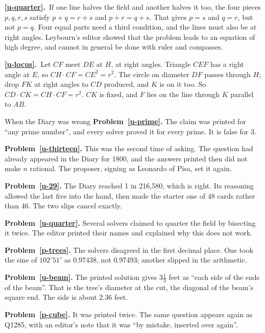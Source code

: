 \documentclass[11pt,a4paper]{article}
\newcounter{prob}
\newcommand{\ans}[2]{\par\smallskip\noindent\textbf{\ref{#1}.}\ #2}
\begin{document}
\ans{u-quarter}{If one line halves the field and another halves it too, the four pieces
$p, q, r, s$ satisfy $p+q = r+s$ and $p+r = q+s$. That gives $p = s$ and $q = r$, but not
$p = q$. Four equal parts need a third condition, and the lines must also be at right
angles. Leybourn's editor showed that the problem leads to an equation of high degree,
and cannot in general be done with ruler and compasses.}
\ans{u-locus}{Let $CF$ meet $DE$ at $H$, at right angles. Triangle $CEF$ has a right
angle at $E$, so $CH\cdot CF = CE^2 = r^2$. The circle on diameter $DF$ passes through
$H$; drop $FK$ at right angles to $CD$ produced, and $K$ is on it too. So $CD\cdot CK =
CH\cdot CF = r^2$. $CK$ is fixed, and $F$ lies on the line through $K$ parallel to $AB$.}

\begin{diarynote}{When the Diary was wrong}
\textbf{Problem~\ref{u-prime}.} The claim was printed for ``any prime number'', and every
solver proved it for every prime. It is false for 3.

\textbf{Problem~\ref{u-thirteen}.} This was the second time of asking. The question had
already appeared in the Diary for 1800, and the answers printed then did not make $n$
rational. The proposer, signing as Leonardo of Pisa, set it again.

\textbf{Problem~\ref{u-29}.} The Diary reached 1 in 216{,}580, which is right. Its
reasoning allowed the last five into the hand, then made the starter one of 48 cards
rather than 46. The two slips cancel exactly.

\textbf{Problem~\ref{u-quarter}.} Several solvers claimed to quarter the field by
bisecting it twice. The editor printed their names and explained why this does not work.

\textbf{Problem~\ref{p-trees}.} The solvers disagreed in the first decimal place. One took
the sine of $102^\circ51'$ as 0.97438, not 0.97493; another slipped in the arithmetic.

\textbf{Problem~\ref{u-beam}.} The printed solution gives $3\tfrac13$ feet as ``each side of
the ends of the beam''. That is the tree's diameter at the cut, the diagonal of the
beam's square end. The side is about 2.36 feet.

\textbf{Problem~\ref{p-cube}.} It was printed twice. The same question appears again as
Q1285, with an editor's note that it was ``by mistake, inserted over again''.
\end{diarynote}
\end{document}
